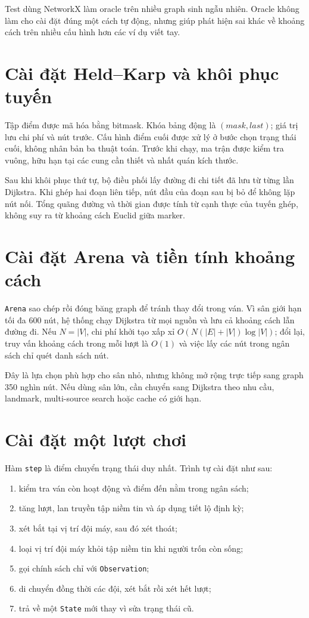 Test dùng NetworkX làm oracle trên nhiều graph sinh ngẫu nhiên. Oracle không làm
cho cài đặt đúng một cách tự động, nhưng giúp phát hiện sai khác về khoảng cách
trên nhiều cấu hình hơn các ví dụ viết tay.

\section{Cài đặt Held--Karp và khôi phục tuyến}

Tập điểm được mã hóa bằng bitmask. Khóa bảng động là $(mask,last)$; giá trị lưu
chi phí và nút trước. Cấu hình điểm cuối được xử lý ở bước chọn trạng thái cuối,
không nhân bản ba thuật toán. Trước khi chạy, ma trận được kiểm tra vuông, hữu
hạn tại các cung cần thiết và nhất quán kích thước.

Sau khi khôi phục thứ tự, bộ điều phối lấy đường đi chi tiết đã lưu từ từng lần
Dijkstra. Khi ghép hai đoạn liên tiếp, nút đầu của đoạn sau bị bỏ để không lặp
nút nối. Tổng quãng đường và thời gian được tính từ cạnh thực của tuyến ghép,
không suy ra từ khoảng cách Euclid giữa marker.

\section{Cài đặt Arena và tiền tính khoảng cách}

\texttt{Arena} sao chép rồi đóng băng graph để tránh thay đổi trong ván. Vì sân
giới hạn tối đa 600 nút, hệ thống chạy Dijkstra từ mọi nguồn và lưu cả khoảng
cách lẫn đường đi. Nếu $N=|V|$, chi phí khởi tạo xấp xỉ
$O(N(|E|+|V|)\log |V|)$; đổi lại, truy vấn khoảng cách trong mỗi lượt là $O(1)$
và việc lấy các nút trong ngân sách chỉ quét danh sách nút.

Đây là lựa chọn phù hợp cho sân nhỏ, nhưng không mở rộng trực tiếp sang graph
350 nghìn nút. Nếu dùng sân lớn, cần chuyển sang Dijkstra theo nhu cầu, landmark,
multi-source search hoặc cache có giới hạn.

\section{Cài đặt một lượt chơi}

Hàm \texttt{step} là điểm chuyển trạng thái duy nhất. Trình tự cài đặt như sau:
\begin{enumerate}
  \item kiểm tra ván còn hoạt động và điểm đến nằm trong ngân sách;
  \item tăng lượt, lan truyền tập niềm tin và áp dụng tiết lộ định kỳ;
  \item xét bắt tại vị trí đội máy, sau đó xét thoát;
  \item loại vị trí đội máy khỏi tập niềm tin khi người trốn còn sống;
  \item gọi chính sách chỉ với \texttt{Observation};
  \item di chuyển đồng thời các đội, xét bắt rồi xét hết lượt;
  \item trả về một \texttt{State} mới thay vì sửa trạng thái cũ.
\end{enumerate}

